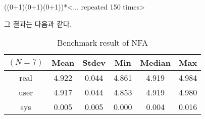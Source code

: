\documentclass[a4paper,10pt]{scrartcl}
\numberwithin{figure}{section}
\numberwithin{table}{section}
\theoremstyle{definition}
\begin{document}
\begin{codebox}
((0+1)(0+1)(0+1))*<... repeated 150 times>
\end{codebox}

\noindent 그 결과는 다음과 같다.

\begin{table}[H]
  \centering
  \caption{Benchmark result of NFA}\label{tab:benchmark}
  \vspace*{-10pt}
  \begin{tabular}[t]{ c c c c c c }
    \toprule
    $(N=7)$ & Mean  & Stdev & Min   & Median & Max   \\
    \midrule
    real  & 4.922 & 0.044 & 4.861 & 4.919  & 4.984 \\
    user  & 4.917 & 0.044 & 4.853 & 4.919  & 4.980 \\
    sys   & 0.005 & 0.005 & 0.000 & 0.004  & 0.016 \\
    \bottomrule
  \end{tabular}
\end{table}
\end{document}
